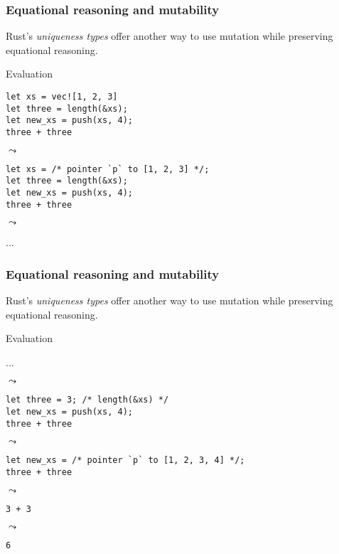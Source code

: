 \documentclass[t]{beamer}
\begin{document}
\begin{frame}[fragile]
\frametitle{Equational reasoning and mutability}
Rust's \emph{uniqueness types} offer another way to use mutation while
preserving equational reasoning.

\begin{block}{Evaluation}

\begin{verbatim}
let xs = vec![1, 2, 3]
let three = length(&xs);
let new_xs = push(xs, 4);
three + three
\end{verbatim}

\(\leadsto\)

\begin{verbatim}
let xs = /* pointer `p` to [1, 2, 3] */;
let three = length(&xs);
let new_xs = push(xs, 4);
three + three
\end{verbatim}

\(\leadsto\)

...

\end{block}

\end{frame}


\begin{frame}[fragile]
\frametitle{Equational reasoning and mutability}
Rust's \emph{uniqueness types} offer another way to use mutation while
preserving equational reasoning.

\begin{block}{Evaluation}

...

\(\leadsto\)

\begin{verbatim}
let three = 3; /* length(&xs) */
let new_xs = push(xs, 4);
three + three
\end{verbatim}

\(\leadsto\)

\begin{verbatim}
let new_xs = /* pointer `p` to [1, 2, 3, 4] */;
three + three
\end{verbatim}

\(\leadsto\)

\begin{verbatim}
3 + 3
\end{verbatim}

\(\leadsto\)

\begin{verbatim}
6
\end{verbatim}

\end{block}

\end{frame}
\end{document}
